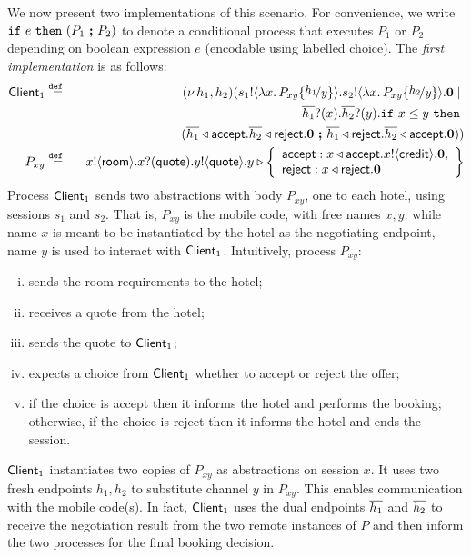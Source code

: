 We now present two \HOp implementations of this scenario.
For convenience, we write $\mathtt{if}\  e\ \mathtt{then}\  (P_1\ \boldsymbol{;} \ P_2)$ 
to denote a conditional process that executes $P_1$ or $P_2$ depending on boolean expression $e$ (encodable using labelled choice).
The \emph{first implementation} is  as follows:
%
	\begin{eqnarray*}%
		 \Client_1   & \defeq  &  \newsp{h_1, h_2}{\bout{s_1}{\abs{x}{P_{xy} \subst{h_1}{y}}} \bout{s_2}{\abs{x}{P_{xy} \subst{h_2}{y}}} \inact \Par  \\
		& & 
		\qquad \qquad\binp{\dual{h_1}}{x} \binp{\dual{h_2}}{y}  \If x \leq y\   \Then\\
		& & \qquad\qquad \qquad \qquad (\bsel{\dual{h_1}}{\accept} \bsel{\dual{h_2}}{\reject} \inact \ \Else \ \bsel{\dual{h_1}}{\reject} \bsel{\dual{h_2}}{\accept} \inact )
		}
		\\
				 P_{xy}    & \defeq &    \bout{x}{\rtype} \binp{x}{\Quote} \bout{y}{\Quote}
		y \triangleright \left\{
				\begin{array}{l}
					\accept: \bsel{x}{\accept} \bout{x}{\creditc} \inact,\\
					\reject: \bsel{x}{\reject} \inact
				\end{array}
				\right\}
	\end{eqnarray*}
%
Process $\mathsf{Client}_1$ sends two abstractions with body $P_{xy}$, one to each hotel, 
		using sessions $s_1$ and $s_2$.
		That is, $P_{xy}$ is the mobile code, with free names $x, y$:
	while
		name $x$ is meant to be instantiated by the hotel as the negotiating
		endpoint, name $y$ is used to interact with $\mathsf{Client}_1$.	
		Intuitively, process $P_{xy}$:
		\begin{enumerate}[(i)]
		 \item sends the room requirements to the hotel;
		\item  receives a quote from the hotel;
		\item  sends the quote to  $\mathsf{Client}_1$;
		\item expects a choice from   $\mathsf{Client}_1$ whether to accept or reject the offer;
		\item if the choice is accept then it informs the hotel and performs the booking;
		otherwise, if the choice is reject then it informs the hotel and ends the session.
		\end{enumerate}
				$\mathsf{Client}_1$ instantiates two copies of  $P_{xy}$ as abstractions
		on session $x$. It uses two
		fresh endpoints $h_1, h_2$ to substitute channel $y$
		in $P_{xy}$. This enables communication with the mobile code(s).
		In fact, 
		$\mathsf{Client}_1$ uses the dual endpoints $\overline{h_1}$ and $\overline{h_2}$
		to receive the negotiation
		result from the two remote instances of $P$ and then inform the two
		processes for the final booking decision.

